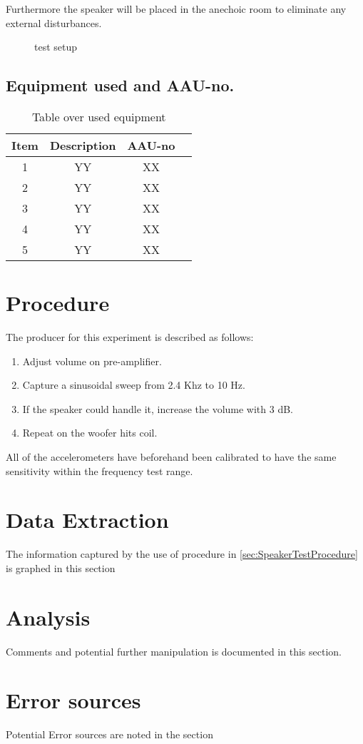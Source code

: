 Furthermore the speaker will be placed in the anechoic room to eliminate any external disturbances. 


\begin{figure}[H]
\centering
{}
\caption{test setup}
\label{figure:SpeakertestSetup}
\end{figure}

\subsection*{Equipment used and AAU-no.}

\begin{table}[H]
\centering
{}
\begin{tabular}{S[table-format=1]ccc} \toprule
    {Item} & {Description} & {AAU-no} \\       & YY  & XX   \\ 
    2      & YY  & XX   \\ 
    3      & YY  & XX   \\
    4      & YY  & XX   \\ 
    5      & YY  & XX  \\ \bottomrule 
\end{tabular}
\caption{Table over used equipment}
\end{table}



\section{Procedure}\label{sec:SpeakerTestProcedure}

The producer for this experiment is described as follows:
\begin{enumerate}
\item Adjust volume on pre-amplifier.
\item Capture a sinusoidal sweep from 2.4 Khz to 10 Hz.
\item If the speaker could handle it, increase the volume with 3 dB.
\item Repeat on the woofer hits coil. 
\end{enumerate}

All of the accelerometers have beforehand been calibrated to have the same sensitivity within the frequency test range.


\section{Data Extraction}

The information captured by the use of procedure in \autoref{sec:SpeakerTestProcedure} is graphed in this section


\section{Analysis}

Comments and potential further manipulation is documented in this section. 

\section{Error sources}

Potential Error sources are noted in the section

